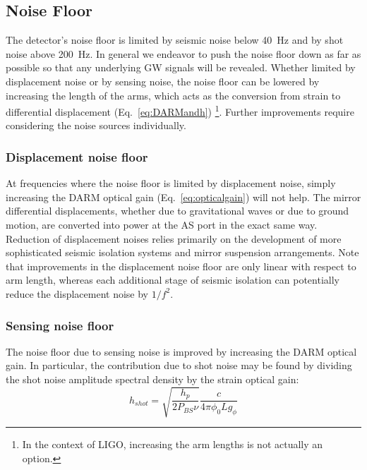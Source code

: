\subsection{Noise Floor}
The detector's noise floor is limited by seismic noise below 40~Hz and
by shot noise above 200~Hz.  In general we endeavor to push the noise
floor down as far as possible so that any underlying GW signals will
be revealed.  Whether limited by displacement noise or by sensing
noise, the noise floor
can be lowered by increasing the length of the arms, which acts as the
conversion from strain to differential displacement
(Eq.~\ref{eq:DARMandh}) \footnote{In the context of LIGO, increasing
  the arm lengths is not actually an option.}. Further improvements
require considering the noise sources individually.





\subsubsection{Displacement noise floor} 
At frequencies where the noise floor is limited by displacement noise,
simply increasing the DARM optical gain (Eq.~\ref{eq:opticalgain})
will not help. The mirror differential displacements, whether due to
gravitational waves or due to ground motion, are converted into power
at the AS port in the exact same way. Reduction of displacement noises
relies primarily on the development of more sophisticated seismic
isolation systems and mirror suspension arrangements. Note that
improvements in the displacement noise floor are only linear with
respect to arm length, whereas each additional stage of seismic
isolation can potentially reduce the displacement noise by $1/f^2$.

\subsubsection{Sensing noise floor}
The noise floor due to sensing noise is improved by increasing the
DARM optical gain. In particular, the contribution due to shot noise
may be found by dividing the shot noise amplitude spectral density
by the strain optical gain:
\begin{equation}
h_{shot} = \sqrt{\frac{h_p}{2 P_{BS} \nu}} \frac{c}{4 \pi \phi_0 L g_{\phi}}
\label{eq:SNL}
\end{equation}

